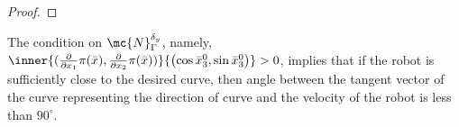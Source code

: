 {{\begin{proof}
\end{proof}}
\begin{remark}
The condition on $\mc{N}_\Gamma^{\by}$, namely,
$\inner{(\frac{\partial }{\partial x_1}\pi(\bar{x}),\frac{\partial }{\partial x_2}\pi(\bar{x}))}{\left(\cos \bar{x}^{0}_3,\sin \bar{x}^{0}_3\right)} >0$, implies that if the robot is sufficiently close to the desired curve, then angle between the tangent vector of the curve representing the direction of curve and the velocity of the robot is less than $90^\circ$.
\end{remark}

}
